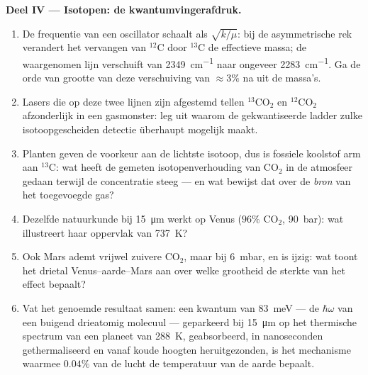 \begin{problem}
\medskip\noindent\textbf{Deel IV --- Isotopen: de
kwantumvingerafdruk.}
\begin{enumerate}[resume]
  \item De frequentie van een oscillator schaalt als $\sqrt{k/\mu}$: bij
        de asymmetrische rek verandert het vervangen van $^{12}$C door
        $^{13}$C de effectieve massa; de waargenomen lijn verschuift van
        \qty{2349}{cm^{-1}} naar ongeveer \qty{2283}{cm^{-1}}. Ga de orde
        van grootte van deze verschuiving van $\approx 3\%$ na uit de
        massa's.
  \item Lasers die op deze twee lijnen zijn afgestemd tellen
        $^{13}$CO$_2$ en $^{12}$CO$_2$ afzonderlijk in een gasmonster:
        leg uit waarom de gekwantiseerde ladder zulke isotoopgescheiden
        detectie überhaupt mogelijk maakt.
  \item Planten geven de voorkeur aan de lichtste isotoop, dus is fossiele
        koolstof arm aan $^{13}$C: wat heeft de gemeten isotopenverhouding
        van CO$_2$ in de atmosfeer gedaan terwijl de concentratie steeg
        --- en wat bewijst dat over de \emph{bron} van het toegevoegde
        gas?
  \item Dezelfde natuurkunde bij \qty{15}{\micro m} werkt op Venus
        ($96\%$ CO$_2$, \qty{90}{bar}): wat illustreert haar oppervlak van
        \qty{737}{K}?
  \item Ook Mars ademt vrijwel zuivere CO$_2$, maar bij \qty{6}{mbar}, en
        is ijzig: wat toont het drietal Venus--aarde--Mars aan over welke
        grootheid de sterkte van het effect bepaalt?
  \item Vat het genoemde resultaat samen: een kwantum van \qty{83}{meV}
        --- de $\hbar\omega$ van een buigend drieatomig molecuul ---
        geparkeerd bij \qty{15}{\micro m} op het thermische spectrum van
        een planeet van \qty{288}{K}, geabsorbeerd, in nanoseconden
        gethermaliseerd en vanaf koude hoogten heruitgezonden, is het
        mechanisme waarmee $0.04\%$ van de lucht de temperatuur van de
        aarde bepaalt.
\end{enumerate}
\end{problem}
